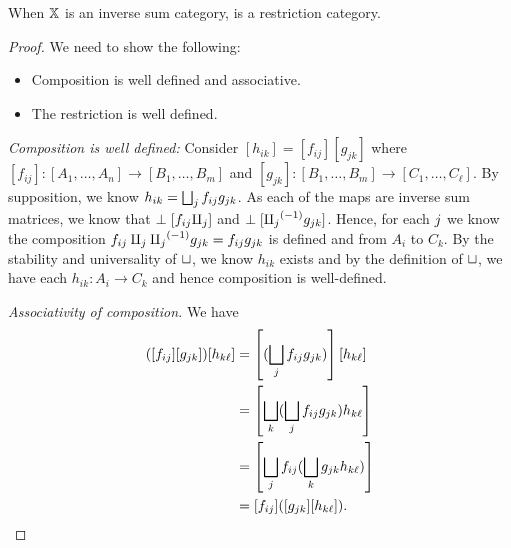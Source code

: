 \begin{lemma}\label{lem:inverse_matrix_category_is_a_restriction_category}
  When $\mathbb{X}$ is an inverse sum category, \imatx is a restriction category.
\end{lemma}
\begin{proof}
  We need to show the following:
  \begin{itemize}
    \item Composition is well defined and associative.
    \item The restriction is well defined.
  \end{itemize}

  \emph{Composition is well defined:} Consider $[h_{i k}] = [f_{i j}] [g_{j k}]$ where $[f_{i j}]:
  [A_1,\ldots, A_n] \to [B_1,\ldots, B_m]$ and $[g_{j k}]: [B_1,\ldots, B_m] \to [C_1,\ldots,
  C_\ell]$. By supposition, we know $h_{i k} = \bigsqcup_j f_{i j} g_{j k}$. As each of
  the maps are inverse sum matrices, we know that $\perp [f_{i j} \amalg_{j}]$ and
  $\perp[{\amalg_{j}}^{(-1)}g_{j k}]$. Hence, for each $j$ we know the composition $f_{i j}
  \amalg_{j} {\amalg_{j}}^{(-1)}g_{j k} = f_{i j} g_{j k}$ is defined and from $A_i$ to $C_{k}$. By
  the stability and universality of $\sqcup$, we know $h_{i k}$ exists and by the definition of
  $\sqcup$, we have each $h_{i k}: A_i \to C_k$ and hence composition is well-defined.

  \emph{Associativity of composition.} We have
  \begin{align*}
    ([f_{i j}] [g_{j k}]) [h_{k \ell}]
        &= \left[(\bigsqcup_j f_{i j}  g_{j k})\right] [h_{k \ell}]\\
        &=\left[ \bigsqcup_k (\bigsqcup_j f_{i j} g_{j k}) h_{k \ell}\right]\\
        &=\left[ \bigsqcup_j f_{i j}  (\bigsqcup_k g_{j k} h_{k \ell})\right]\\
        &=[ f_{i j} ]  ([g_{j k}] [h_{k \ell}]).
  \end{align*}


\end{proof}
